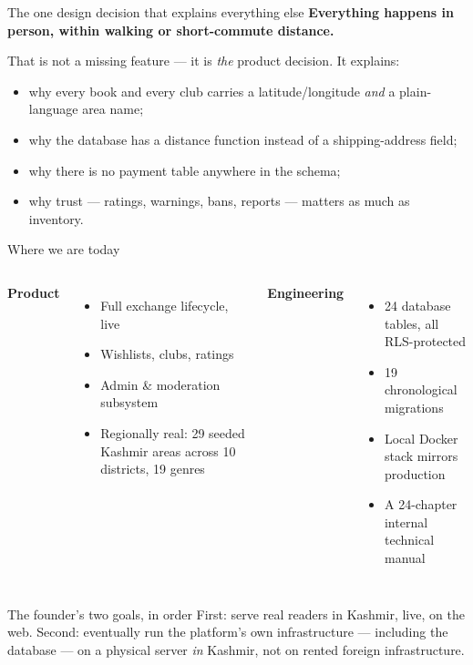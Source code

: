 \documentclass[aspectratio=169,11pt]{beamer}
\begin{document}
\begin{frame}{The one design decision that explains everything else}
  \textbf{Everything happens in person, within walking or short-commute distance.}
  \vspace{4pt}

  That is not a missing feature --- it is \emph{the} product decision. It explains:
  \begin{itemize}
    \item why every book and every club carries a latitude/longitude \emph{and} a plain-language area name;
    \item why the database has a distance function instead of a shipping-address field;
    \item why there is no payment table anywhere in the schema;
    \item why \alert{trust} --- ratings, warnings, bans, reports --- matters as much as inventory.
  \end{itemize}
\end{frame}

\begin{frame}{Where we are today}
  \begin{columns}[T]
    \textbf{Product}
    \begin{itemize}
      \item Full exchange lifecycle, live
      \item Wishlists, clubs, ratings
      \item Admin \& moderation subsystem
      \item Regionally real: 29 seeded Kashmir areas across 10 districts, 19 genres
    \end{itemize}
    \textbf{Engineering}
    \begin{itemize}
      \item 24 database tables, all RLS-protected
      \item 19 chronological migrations
      \item Local Docker stack mirrors production
      \item A 24-chapter internal technical manual
    \end{itemize}
  \end{columns}
  \vfill
  \begin{alertblock}{The founder's two goals, in order}
    First: serve real readers in Kashmir, live, on the web. Second: eventually run the platform's own infrastructure --- including the database --- on a physical server \emph{in} Kashmir, not on rented foreign infrastructure.
  \end{alertblock}
\end{frame}
\end{document}
